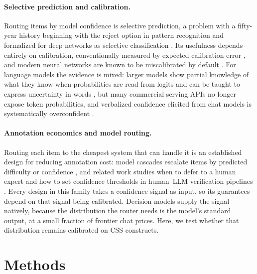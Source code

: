 \documentclass[11pt]{article}
\begin{document}
\paragraph{Selective prediction and calibration.}
Routing items by model confidence is selective prediction, a problem with a fifty-year history beginning with the reject option in pattern recognition \citep{chow1970optimum} and formalized for deep networks as selective classification \citep{geifman2017selective}. Its usefulness depends entirely on calibration, conventionally measured by expected calibration error \citep{naeini2015obtaining}, and modern neural networks are known to be miscalibrated by default \citep{guo2017calibration}. For language models the evidence is mixed: larger models show partial knowledge of what they know when probabilities are read from logits \citep{kadavath2022language} and can be taught to express uncertainty in words \citep{lin2022teaching}, but many commercial serving APIs no longer expose token probabilities, and verbalized confidence elicited from chat models is systematically overconfident \citep{xiong2023can, tian2023just}.

\paragraph{Annotation economics and model routing.}
Routing each item to the cheapest system that can handle it is an established design for reducing annotation cost: model cascades escalate items by predicted difficulty or confidence \citep{chen2023frugalgpt, ding2024hybrid}, and related work studies when to defer to a human expert \citep{mozannar2020consistent} and how to set confidence thresholds in human--LLM verification pipelines \citep{wang2024human}. Every design in this family takes a confidence signal as input, so its guarantees depend on that signal being calibrated. Decision models supply the signal natively, because the distribution the router needs is the model's standard output, at a small fraction of frontier chat prices. Here, we test whether that distribution remains calibrated on CSS constructs.

\section{Methods}
\end{document}
